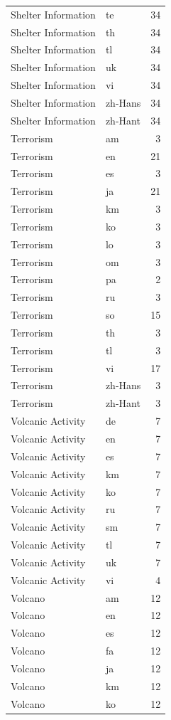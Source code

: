 \begin{longtable}{p{3cm} p{3cm} r}
Shelter Information & te & 34 \\
Shelter Information & th & 34 \\
Shelter Information & tl & 34 \\
Shelter Information & uk & 34 \\
Shelter Information & vi & 34 \\
Shelter Information & zh-Hans & 34 \\
Shelter Information & zh-Hant & 34 \\
Terrorism & am & 3 \\
Terrorism & en & 21 \\
Terrorism & es & 3 \\
Terrorism & ja & 21 \\
Terrorism & km & 3 \\
Terrorism & ko & 3 \\
Terrorism & lo & 3 \\
Terrorism & om & 3 \\
Terrorism & pa & 2 \\
Terrorism & ru & 3 \\
Terrorism & so & 15 \\
Terrorism & th & 3 \\
Terrorism & tl & 3 \\
Terrorism & vi & 17 \\
Terrorism & zh-Hans & 3 \\
Terrorism & zh-Hant & 3 \\
Volcanic Activity & de & 7 \\
Volcanic Activity & en & 7 \\
Volcanic Activity & es & 7 \\
Volcanic Activity & km & 7 \\
Volcanic Activity & ko & 7 \\
Volcanic Activity & ru & 7 \\
Volcanic Activity & sm & 7 \\
Volcanic Activity & tl & 7 \\
Volcanic Activity & uk & 7 \\
Volcanic Activity & vi & 4 \\
Volcano & am & 12 \\
Volcano & en & 12 \\
Volcano & es & 12 \\
Volcano & fa & 12 \\
Volcano & ja & 12 \\
Volcano & km & 12 \\
Volcano & ko & 12 \\

\end{longtable}
